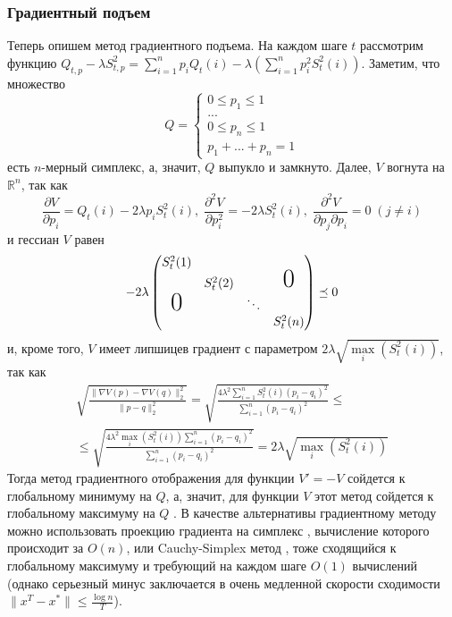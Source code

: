 \subsubsection{Градиентный подъем}
Теперь опишем метод градиентного подъема. На каждом шаге $t$ рассмотрим функцию $Q_{t,p} - \lambda S_{t,p}^2 = \sum_{i=1}^n p_i Q_t(i) - \lambda \left( \sum_{i=1}^n p_i^2 S_t^2(i)\right)$. Заметим, что множество
     $$
     Q =
        \begin{cases}
           0 \leq p_1 \leq 1 \\
            ... \\
            0 \leq p_{n} \leq 1 \\
            p_1 + ... + p_n = 1
        \end{cases}
        \label{eq:4}
     $$
     есть $n$-мерный симплекс, а, значит, $Q$ выпукло и замкнуто. Далее, $V$ вогнута на $\mathbb{R}^n$, так как
     $$
     \frac{\partial V}{\partial p_i} = Q_t(i) - 2\lambda p_i S_t^2(i), \;
     \frac{\partial^2 V}{\partial p_i^2} = -2\lambda S_t^2(i), \;
     \frac{\partial^2 V}{\partial p_j \partial p_i} = 0 \; (j \neq i)
     $$
    и гессиан $V$ равен
    $$
    -2\lambda
    \begin{pmatrix}
        S_t^2(1)        &          &        &                  \\
                        & S_t^2(2) &        & \text{\huge{0}}  \\
        \text{\huge{0}} &          & \ddots &                  \\
                        &          &        & S_t^2(n)
    \end{pmatrix}
    \preceq 0
    $$
    и, кроме того, $V$ имеет липшицев градиент с параметром $2\lambda \sqrt{\underset{i}{\max}(S_t^2(i))}$, так как 
    \begin{multline}
        \sqrt{\frac{\| \nabla V (p) - \nabla V (q) \|_2^2}{\| p - q \|_2^2}} = \sqrt{\frac{4\lambda^2 \sum_{i=1}^n S_t^2(i) (p_i - q_i)^2}{\sum_{i=1}^n (p_i - q_i)^2}} \leq \\ \leq \sqrt{\frac{4\lambda^2 \underset{i}{\max}(S_t^2(i)) \sum_{i=1}^n (p_i - q_i)^2}{\sum_{i=1}^n (p_i - q_i)^2}} = 2\lambda \sqrt{\underset{i}{\max}(S_t^2(i))}
    \end{multline}
    Тогда метод градиентного отображения для функции $V' = -V$ сойдется к глобальному минимуму на $Q$, а, значит, для функции $V$ этот метод сойдется к глобальному максимуму на $Q$ \cite{nesterov_convergence}. В качестве альтернативы градиентному методу можно использовать проекцию градиента на симплекс \cite{simplex_projection}, вычисление которого происходит за $O(n)$, или Cauchy-Simplex метод \cite{cauchy_simplex}, тоже сходящийся к глобальному максимуму и требующий на каждом шаге $O(1)$ вычислений (однако серьезный минус заключается в очень медленной скорости сходимости $\| x^T - x^*\| \leq \frac{\log n}{T}$).

